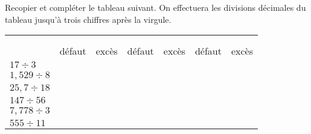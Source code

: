 Recopier et compléter le tableau suivant. On effectuera les
divisions décimales du tableau jusqu'à trois chiffres après la
virgule.

\begin{center}
\begin{tabularx}{\textwidth}{*{7}{|>{\centering}X}|}
 
       &  &  &  \tabularnewline
{}
       &  &  &  \tabularnewline
       &     défaut &      excès
&     défaut &      excès &     défaut &      excès
       \tabularnewline \hline
       $17 \div 3$ &            &            &            & & &
       \tabularnewline \hline
       $1,529 \div 8$ &            &            & & &            &
       \tabularnewline \hline
       $25,7 \div 18$ &            &            &            & &            &
       \tabularnewline \hline
       $147 \div 56$ &            &            &            &
       & &            \tabularnewline \hline
       $7,778 \div 3$ &            &            &            & & &
       \tabularnewline \hline
       $555 \div 11$ &            &            &            & &            &
       \tabularnewline \hline
\end{tabularx}
\end{center}
